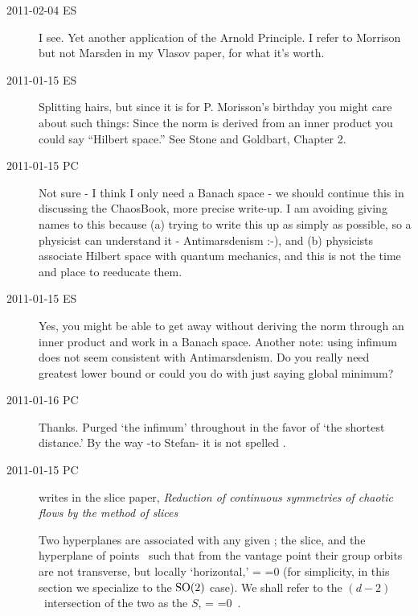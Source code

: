\begin{description}
\item[2011-02-04 ES]
I see. Yet another application of the 
{Arnold Principle}. I refer to Morrison but not Marsden in my Vlasov paper,
for what it's worth.


\item[2011-01-15 ES]
Splitting hairs, but since it is for P. Morisson's birthday you might
care about such things: Since the norm is derived from an inner product you
could say ``Hilbert space.'' See Stone and Goldbart, Chapter 2.

\item[2011-01-15 PC]
Not sure - I think I only need a Banach space - we should continue this in
discussing the ChaosBook, more precise write-up. I am avoiding giving names to
this because (a) trying to write this up as simply as possible, so a physicist can
understand it - Antimarsdenism :-), and (b) physicists associate Hilbert space
with quantum mechanics, and this is not the time and place to reeducate them.

\item[2011-01-15 ES]
Yes, you might be able to get away without deriving the norm through an
inner product and work in a Banach space. Another note: using infimum
does not seem consistent with Antimarsdenism. Do you really need greatest
lower bound or could you do with just saying global minimum?

\item[2011-01-16 PC] Thanks. Purged `the infimum' throughout in the favor of
`the shortest distance.' By the way -to Stefan- it is not spelled
.

\item[2011-01-15 PC] writes in the slice paper,
{\emph{Reduction of continuous symmetries}} \emph{of chaotic flows by the
method of slices}

Two
hyperplanes are associated with  any given {\template} \slicep; the slice,
and the hyperplane of points \sspSing\ such that from
the {\template} vantage point their group orbits are not transverse, but
locally `horizontal,'
\beq
\braket{\groupTan(\sspSing)}{\sliceTan{}}
 =
\braket{\sspSing}{\Lg^2\slicep}
 =0
(for simplicity, in this section we specialize to the  $\textrm{SO}(2)$ case).
We shall refer to the $(d\!-\!2)$\dmn\ intersection of the two as the
{\em \sset} $S$,
\beq
\braket{\groupTan(\sspRSing)}{\sliceTan{}}
 =
\braket{\sspRSing}{\Lg^2\slicep}
 =0
\,.



\end{description}
